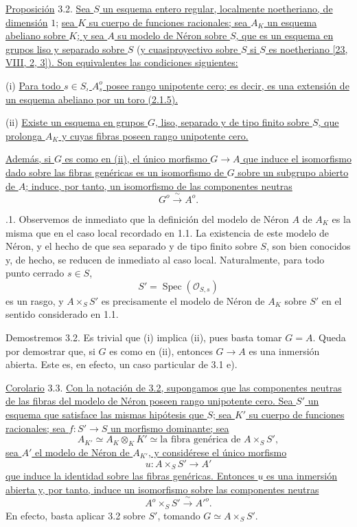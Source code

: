 \par\medskip
\noindent
\underline{Proposición} 3.2. \underline{Sea $S$ un esquema entero
regular, localmente noetheriano, de dimensión} $1$; \underline{sea $K$ su cuerpo de
funciones racionales; sea $A_K$ un esquema abeliano sobre $K$; y sea
$A$ su modelo de Néron sobre $S$, que es un esquema en grupos liso y
separado sobre $S$} (\underline{y cuasiproyectivo sobre $S$ si $S$ es noetheriano
[23, VIII, 2, 3\textdegree]). Son equivalentes las condiciones
siguientes:}

\smallskip
\noindent
(i) \underline{Para todo $s\in S$, $A_s^o$ posee rango unipotente cero;
es decir, es una extensión de un esquema abeliano por un toro (2.1.5).}

\smallskip
\noindent
(ii) \underline{Existe un esquema en grupos $G$, liso, separado y de
tipo finito sobre $S$, que prolonga $A_K$ y cuyas fibras poseen rango
unipotente cero.}

\smallskip
\noindent
\underline{Además, si $G$ es como en (ii), el único morfismo
$G\longrightarrow A$ que induce el isomorfismo dado sobre las fibras
genéricas es un isomorfismo de $G$ sobre un subgrupo abierto de $A$;
induce, por tanto, un isomorfismo de las componentes neutras}
\[
 G^o\xrightarrow{\ \sim\ }A^o.
\]

\medskip
{}.1. Observemos de inmediato que la definición del modelo de Néron
$A$ de $A_K$ es la misma que en el caso local recordado en 1.1. La
existencia de este modelo de Néron, y el hecho de que sea separado y de
tipo finito sobre $S$, son bien conocidos y, de hecho, se reducen de
inmediato al caso local. Naturalmente, para todo punto cerrado $s\in S$,
\[
 S'=\operatorname{Spec}(\mathcal O_{S,s})
\]
es un rasgo, y $A\times_S S'$ es precisamente el modelo de Néron de
$A_K$ sobre $S'$ en el sentido considerado en 1.1.

Demostremos 3.2. Es trivial que (i) implica (ii), pues basta tomar
$G=A$. Queda por demostrar que, si $G$ es como en (ii), entonces
$G\longrightarrow A$ es una inmersión abierta. Este es, en efecto, un
caso particular de 3.1 e).

\medskip
\noindent
\underline{Corolario} 3.3. \underline{Con la notación de 3.2,
supongamos que las componentes neutras de las fibras del modelo de
Néron poseen rango unipotente cero. Sea $S'$ un esquema que satisface
las mismas hipótesis que $S$; sea $K'$ su cuerpo de funciones
racionales; sea $f:S'\longrightarrow S$ un morfismo dominante; sea}
\[
 A_{K'}\simeq A_K\otimes_KK'
 \simeq \text{la fibra genérica de }A\times_SS',
\]
\underline{sea $A'$ el modelo de Néron de $A_{K'}$, y considérese el
único morfismo}
\[
 u:A\times_SS'\longrightarrow A'
\]
\underline{que induce la identidad sobre las fibras genéricas. Entonces
$u$ es una inmersión abierta y, por tanto, induce un isomorfismo sobre
las componentes neutras}
\begin{equation}\tag{3.3.1}
 A^o\times_SS'\xrightarrow{\ \sim\ }{A'}^o.
\end{equation}
En efecto, basta aplicar 3.2 sobre $S'$, tomando
$G\simeq A\times_SS'$.

